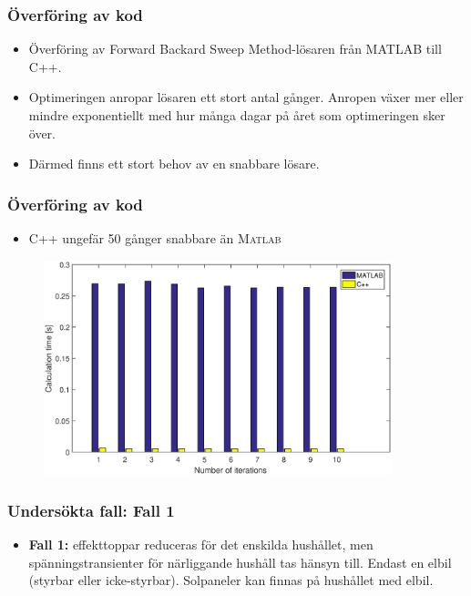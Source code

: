 \documentclass[noamsthm, swedish]{beamer}
\begin{document}
\begin{frame}
\frametitle{Överföring av kod}
    \begin{itemize}
        \item Överföring av Forward Backard Sweep Method-lösaren från MATLAB till C++.
        \item Optimeringen anropar lösaren ett stort antal gånger. Anropen växer mer eller mindre exponentiellt med hur många dagar på året som optimeringen sker över.
        \item Därmed finns ett stort behov av en snabbare lösare.
    \end{itemize}
\end{frame}

\begin{frame}
\frametitle{Överföring av kod}
    \begin{itemize}
        \item C++ ungefär 50 gånger snabbare än \textsc{Matlab}
    \end{itemize}

    \begin{figure}
        \centering
        \includegraphics[width = 0.9\textwidth]{fig/MvsC_10.eps}
    \end{figure}
\end{frame}

\begin{frame}
\frametitle{Undersökta fall: Fall 1}
\begin{itemize}
    \item \textbf{Fall 1:} effekttoppar reduceras för det enskilda hushållet, men spänningstransienter för närliggande hushåll tas hänsyn till. Endast en elbil (styrbar eller icke-styrbar). Solpaneler kan finnas på hushållet med elbil.
\end{itemize}
\end{frame}
\end{document}
